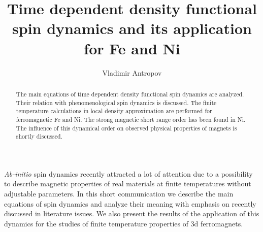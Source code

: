 \documentclass[aps,preprint,twocolumn,10pt]{revtex4}%
\begin{document}
\title{Time dependent density functional spin dynamics and its application for Fe and Ni}
\author{Vladimir Antropov}

\begin{abstract}
The main equations of time dependent density functional spin dynamics are
analyzed. Their relation with phenomenological spin dynamics is discussed. The
finite temperature calculations in local density approximation are performed
for ferromagnetic Fe and Ni. The strong magnetic short range order has been
found in Ni. The influence of this dynamical order on observed physical
properties of magnets is shortly discussed.

\end{abstract}
\maketitle


\textit{Ab-initio} spin dynamics\cite{SD,REV,SAGA} recently attracted a lot of
attention due to a possibility to describe magnetic properties of real
materials at finite temperatures without adjustable parameters. In this short
communication we describe the main equations of spin dynamics and analyze
their meaning with emphasis on recently discussed in literature issues. We
also present the results of the application of this dynamics for the studies
of finite temperature properties of 3d ferromagnets.
\end{document}
